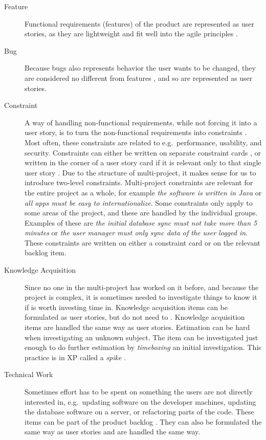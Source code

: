 \begin{description}
  \item[Feature] Functional requirements (features) of the product are represented as user stories, as they are lightweight and fit well into the agile principles \parencite{rubin2012essential}.
  \item[Bug] Because bugs also represents behavior the user wants to be changed, they are considered no different from features \parencite{product-backlog2015}, and so are represented as user stories.
  \item[Constraint] A way of handling non-functional requirements, while not forcing it into a user story, is to turn the non-functional requirements into constraints \parencite[ch.16]{cohn2004}. Most often, these constraints are related to e.g.\ performance, usability, and security. Constraints can either be written on separate constraint cards \parencite[ch.16]{cohn2004}, or written in the corner of a user story card if it is relevant only to that single user story \parencite[ch.7]{cohn2004}. Due to the structure of multi-project, it makes sense for us to introduce two-level constraints. Multi-project constraints are relevant for the entire project as a whole, for example \emph{the software is written in Java} or \emph{all apps must be easy to internationalize}. Some constraints only apply to some areas of the project, and these are handled by the individual groups. Examples of these are \emph{the initial database sync must not take more than 5 minutes} or \emph{the user manager must only sync data of the user logged in}. These constraints are written on either a constraint card or on the relevant backlog item.
  \item[Knowledge Acquisition] Since no one in the multi-project has worked on it before, and because the project is complex, it is sometimes needed to investigate things to know it if is worth investing time in. Knowledge acquisition items can be formulated as user stories, but do not need to \cite{rubin2012essential}. Knowledge acquisition items are handled the same way as user stories. Estimation can be hard when investigating an unknown subject. The item can be investigated just enough to do further estimation by \emph{timeboxing} an initial investigation. This practice is in XP called a \emph{spike} \cite{cohn2004}.
  \item[Technical Work] Sometimes effort has to be spent on something the users are not directly interested in, e.g.\ updating software on the developer machines, updating the database software on a server, or refactoring parts of the code. These items can be part of the product backlog \cite{cohn2004}. They can also be formulated the same way as user stories \cite{rubin2012essential} and are handled the same way.
\end{description}

